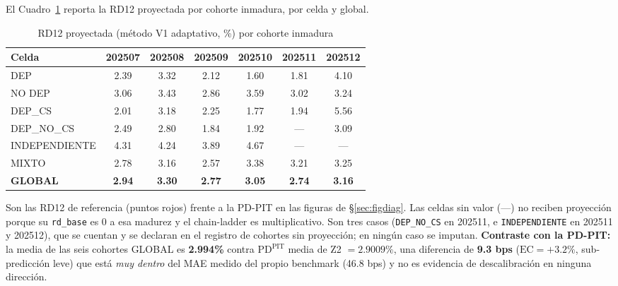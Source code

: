 \documentclass[12pt, a4paper]{article}
\newcommand{\PDPIT}{\ensuremath{\mathrm{PD}^{\mathrm{PIT}}}}
\newcommand{\EC}{\ensuremath{\mathrm{EC}}}
\begin{document}
El Cuadro~\ref{tab:proy} reporta la RD12 proyectada por cohorte inmadura, por celda y global.

\begin{table}[H]
\centering
\caption{RD12 proyectada (método V1 adaptativo, \%) por cohorte inmadura}
\label{tab:proy}
\small
\begin{tabular}{lcccccc}
\toprule
\textbf{Celda} & \textbf{202507} & \textbf{202508} & \textbf{202509} & \textbf{202510} & \textbf{202511} & \textbf{202512} \\
\midrule
DEP           & 2.39 & 3.32 & 2.12 & 1.60 & 1.81 & 4.10 \\
NO DEP        & 3.06 & 3.43 & 2.86 & 3.59 & 3.02 & 3.24 \\
\midrule
DEP\_CS       & 2.01 & 3.18 & 2.25 & 1.77 & 1.94 & 5.56 \\
DEP\_NO\_CS   & 2.49 & 2.80 & 1.84 & 1.92 & ---  & 3.09 \\
INDEPENDIENTE & 4.31 & 4.24 & 3.89 & 4.67 & ---  & ---  \\
MIXTO         & 2.78 & 3.16 & 2.57 & 3.38 & 3.21 & 3.25 \\
\midrule
\textbf{GLOBAL} & \textbf{2.94} & \textbf{3.30} & \textbf{2.77} & \textbf{3.05} & \textbf{2.74} & \textbf{3.16} \\
\bottomrule
\end{tabular}
\end{table}
\noindent Son las RD12 de referencia (puntos rojos) frente a la PD-PIT en las figuras de
\S\ref{sec:figdiag}. Las celdas sin valor (---) no reciben proyección porque su
\texttt{rd\_base} es 0 a esa madurez y el chain-ladder es multiplicativo. Son tres casos
(\texttt{DEP\_NO\_CS} en 202511, e \texttt{INDEPENDIENTE} en 202511 y 202512), que se cuentan y se
declaran en el registro de cohortes sin proyección; en ningún caso se imputan. \textbf{Contraste con la PD-PIT:} la media de
las seis cohortes GLOBAL es \textbf{2.994\%} contra $\PDPIT$ media de Z2 $=2.9009\%$, una diferencia
de \textbf{9.3 bps} ($\EC=+3.2\%$, sub-predicción leve) que está \emph{muy dentro} del MAE medido
del propio benchmark (46.8 bps) y no es evidencia de descalibración en ninguna dirección.
\end{document}
